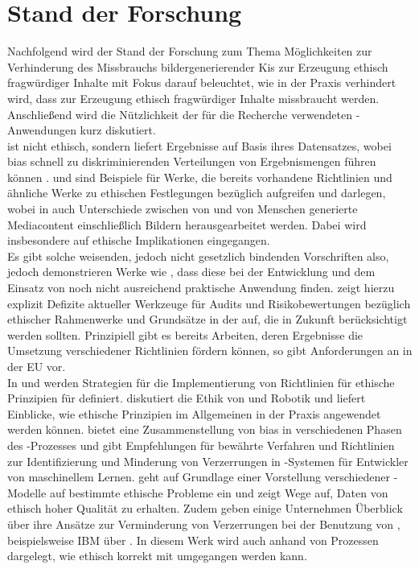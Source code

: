 \chapter{Stand der Forschung}

Nachfolgend wird der Stand der Forschung zum Thema Möglichkeiten zur Verhinderung 
des Missbrauchs bildergenerierender Kis zur Erzeugung ethisch fragwürdiger Inhalte mit Fokus darauf beleuchtet, wie in der Praxis verhindert wird, dass  zur Erzeugung ethisch fragwürdiger Inhalte missbraucht werden. Anschließend wird die Nützlichkeit der für die Recherche verwendeten -Anwendungen kurz diskutiert.\\

 ist nicht ethisch, sondern liefert Ergebnisse auf Basis ihres Datensatzes, wobei \gls{bias} schnell zu diskriminierenden Verteilungen von Ergebnismengen führen können \cite{Salminen}. \cite{Jobin} und \cite{Partadiredja} sind Beispiele für Werke, die bereits vorhandene Richtlinien und ähnliche Werke zu ethischen Festlegungen bezüglich  
aufgreifen und darlegen, wobei in \cite{Partadiredja} auch Unterschiede zwischen von  und von Menschen generierte 
Mediacontent einschließlich Bildern herausgearbeitet werden. Dabei wird insbesondere auf ethische Implikationen eingegangen. \\

Es gibt solche weisenden, jedoch nicht gesetzlich bindenden Vorschriften also, jedoch demonstrieren Werke wie 
\cite{Ayling}, dass diese bei der Entwicklung und dem Einsatz von  noch nicht ausreichend praktische Anwendung 
finden. \cite{Ayling} zeigt hierzu explizit Defizite aktueller Werkzeuge für Audits und Risikobewertungen bezüglich 
ethischer Rahmenwerke und Grundsätze in der  auf, die in Zukunft berücksichtigt werden sollten. 
Prinzipiell gibt es bereits Arbeiten, deren Ergebnisse die Umsetzung verschiedener Richtlinien fördern können, so gibt 
\cite{EUCommision} Anforderungen an  in der EU vor. \\

In \cite{Jobin} und \cite{Hagendorff} werden Strategien 
für die Implementierung von Richtlinien für ethische Prinzipien für  definiert. \cite{Stahl} diskutiert die Ethik von  und Robotik 
und liefert Einblicke, wie ethische Prinzipien im Allgemeinen in der Praxis angewendet werden können. \cite{Srinivasan} bietet 
eine Zusammenstellung von \gls{bias} in verschiedenen Phasen des -Prozesses und gibt Empfehlungen für bewährte Verfahren und 
Richtlinien zur Identifizierung und Minderung von Verzerrungen in -Systemen für Entwickler von maschinellem Lernen. \cite{Jameel} 
geht auf Grundlage einer Vorstellung verschiedener -Modelle auf bestimmte ethische Probleme ein und zeigt Wege auf, 
Daten von ethisch hoher Qualität zu erhalten.
Zudem geben einige Unternehmen Überblick über ihre Ansätze zur Verminderung von Verzerrungen bei der Benutzung von , 
beispielsweise IBM über \cite{Hobson}. In diesem Werk wird auch anhand von Prozessen dargelegt, wie ethisch korrekt mit  
umgegangen werden kann.\\

